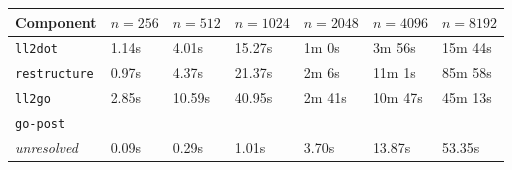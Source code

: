 \begin{table}[htbp]
	\begin{center}
		\begin{tabular}{|l|l|l|l|l|l|l|}
			\hline
			Component & $ n = 256 $ & $ n = 512 $ & $ n = 1024 $ & $ n = 2048 $ & $ n = 4096 $ & $ n = 8192 $ \\
			\hline
			\rowcolor{light_green_3}
			\texttt{ll2dot} & 1.14s & 4.01s & 15.27s & 1m 0s & 3m 56s & 15m 44s \\
			\rowcolor{light_green_3}
			\texttt{restructure} & 0.97s & 4.37s & 21.37s & 2m 6s & 11m 1s & 85m 58s \\
			\rowcolor{light_green_3}
			\texttt{ll2go} & 2.85s & 10.59s & 40.95s & 2m 41s & 10m 47s & 45m 13s \\
			\hline
			\multicolumn{7}{|l|}{\texttt{go-post}} \\
			\hline
			\rowcolor{light_green_3}
			\textit{unresolved} & 0.09s & 0.29s & 1.01s & 3.70s & 13.87s & 53.35s \\

\end{tabular}
\end{center}
\end{table}
